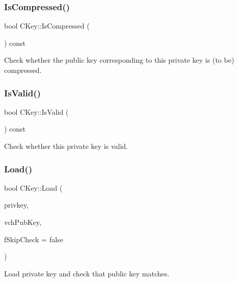 \subsubsection{\texorpdfstring{Is\+Compressed()}{IsCompressed()}}
{\footnotesize\ttfamily bool C\+Key\+::\+Is\+Compressed (\begin{DoxyParamCaption}{ }\end{DoxyParamCaption}) const\hspace{0.3cm}{\ttfamily [inline]}}



Check whether the public key corresponding to this private key is (to be) compressed. 

\mbox{\label{class_c_key_a56e06c48d504a1a65e244e5fc35cdecc}} 
\subsubsection{\texorpdfstring{Is\+Valid()}{IsValid()}}
{\footnotesize\ttfamily bool C\+Key\+::\+Is\+Valid (\begin{DoxyParamCaption}{ }\end{DoxyParamCaption}) const\hspace{0.3cm}{\ttfamily [inline]}}



Check whether this private key is valid. 

\mbox{\label{class_c_key_a141751588f8bfe5f1b6fc27f4e64b63f}} 
\subsubsection{\texorpdfstring{Load()}{Load()}}
{\footnotesize\ttfamily bool C\+Key\+::\+Load (\begin{DoxyParamCaption}\item[{\mbox{\hyperlink{key_8h_a1da569b8b6e5b3fa1196cc1b877e7f54}{C\+Priv\+Key}} \&}]{privkey,  }\item[{\mbox{\hyperlink{class_c_pub_key}{C\+Pub\+Key}} \&}]{vch\+Pub\+Key,  }\item[{bool}]{f\+Skip\+Check = {\ttfamily false} }\end{DoxyParamCaption})}



Load private key and check that public key matches. 

